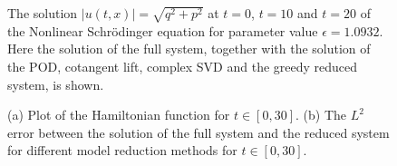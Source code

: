 \begin{figure}
\caption{The solution $|u(t,x)| = \sqrt{q^2 + p^2}$ at $t=0$, $t=10$ and $t=20$ of the Nonlinear Schr\"odinger equation for parameter value $\epsilon = 1.0932$. Here the solution of {\edit the} full system, together with the solution of the POD, cotangent lift, complex SVD and the greedy reduced system, is shown.}
\label{fig:NuRe:3}
\end{figure}

\begin{figure}

\begin{minipage}{.5\linewidth}
\centering
{}
\end{minipage}%
\begin{minipage}{.5\linewidth}
\centering
{}
\end{minipage}\par\medskip
\centering

\caption{{\edit (a) Plot of the Hamiltonian function for $t \in [0,30]$.} (b) The $L^2$ error between the solution of the full system and the reduced system for different model reduction methods for $t \in [0,30]$. }
\label{fig:NuRe:4}
\end{figure}


